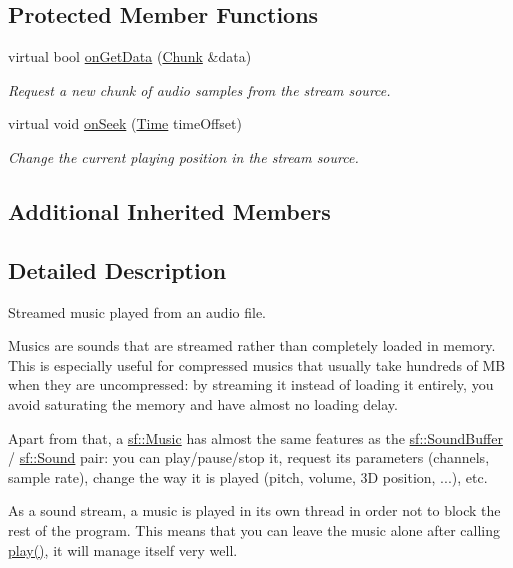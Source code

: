 \subsection*{Protected Member Functions}
\begin{DoxyCompactItemize}
\item 
virtual bool \hyperlink{classsf_1_1_music_aca1bcb4e5d56a854133e74bd86374463}{on\+Get\+Data} (\hyperlink{structsf_1_1_sound_stream_1_1_chunk}{Chunk} \&data)
\begin{DoxyCompactList}\small\item\em Request a new chunk of audio samples from the stream source. \end{DoxyCompactList}\item 
virtual void \hyperlink{classsf_1_1_music_a15119cc0419c16bb334fa0698699c02e}{on\+Seek} (\hyperlink{classsf_1_1_time}{Time} time\+Offset)
\begin{DoxyCompactList}\small\item\em Change the current playing position in the stream source. \end{DoxyCompactList}\end{DoxyCompactItemize}
\subsection*{Additional Inherited Members}


\subsection{Detailed Description}
Streamed music played from an audio file. 

Musics are sounds that are streamed rather than completely loaded in memory. This is especially useful for compressed musics that usually take hundreds of M\+B when they are uncompressed\+: by streaming it instead of loading it entirely, you avoid saturating the memory and have almost no loading delay.

Apart from that, a \hyperlink{classsf_1_1_music}{sf\+::\+Music} has almost the same features as the \hyperlink{classsf_1_1_sound_buffer}{sf\+::\+Sound\+Buffer} / \hyperlink{classsf_1_1_sound}{sf\+::\+Sound} pair\+: you can play/pause/stop it, request its parameters (channels, sample rate), change the way it is played (pitch, volume, 3\+D position, ...), etc.

As a sound stream, a music is played in its own thread in order not to block the rest of the program. This means that you can leave the music alone after calling \hyperlink{classsf_1_1_sound_stream_afdc08b69cab5f243d9324940a85a1144}{play()}, it will manage itself very well.

